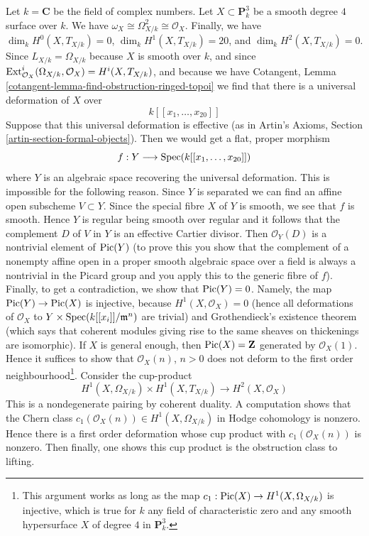 \medskip\noindent
Let $k = \mathbf{C}$ be the field of complex numbers.
Let $X \subset \mathbf{P}^3_k$ be a smooth degree
$4$ surface over $k$. We have
$\omega_X \cong \Omega^2_{X/k} \cong \mathcal{O}_X$.
Finally, we have
$\dim_k H^0(X, T_{X/k}) = 0$,
$\dim_k H^1(X, T_{X/k}) = 20$, and
$\dim_k H^2(X, T_{X/k}) = 0$.
Since $L_{X/k} = \Omega_{X/k}$ because $X$ is smooth over $k$,
and since $\mathop{\mathrm{Ext}}\nolimits^i_{\mathcal{O}_X}(\Omega_{X/k}, \mathcal{O}_X) =
H^i(X, T_{X/k})$, and because we have Cotangent, Lemma
\ref{cotangent-lemma-find-obstruction-ringed-topoi}
we find that there is a universal deformation of $X$
over
$$
k[[x_1, \ldots, x_{20}]]
$$
Suppose that this universal deformation is effective
(as in Artin's Axioms, Section \ref{artin-section-formal-objects}).
Then we would get a flat, proper morphism
$$
f : Y \longrightarrow \mathop{\mathrm{Spec}}(k[[x_1, \ldots, x_{20}]])
$$
where $Y$ is an algebraic space recovering the universal deformation.
This is impossible for the following reason. Since $Y$ is separated
we can find an affine open subscheme $V \subset Y$. Since the special
fibre $X$ of $Y$ is smooth, we see that $f$ is smooth. Hence $Y$
is regular being smooth over regular and it follows
that the complement $D$ of $V$ in $Y$ is an effective Cartier divisor.
Then $\mathcal{O}_Y(D)$ is a nontrivial element of $\mathop{\mathrm{Pic}}\nolimits(Y)$
(to prove this you show that the complement of a nonempty affine open in
a proper smooth algebraic space over a field is always a nontrivial
in the Picard group and you apply this to the generic fibre of $f$).
Finally, to get a contradiction, we show that $\mathop{\mathrm{Pic}}\nolimits(Y) = 0$.
Namely, the map $\mathop{\mathrm{Pic}}\nolimits(Y) \to \mathop{\mathrm{Pic}}\nolimits(X)$ is injective,
because $H^1(X, \mathcal{O}_X) = 0$ (hence all deformations of
$\mathcal{O}_X$ to $Y \times \mathop{\mathrm{Spec}}(k[[x_i]]/\mathfrak m^n)$
are trivial) and Grothendieck's existence theorem
(which says that coherent modules giving rise to the
same sheaves on thickenings are isomorphic).
If $X$ is general enough, then $\mathop{\mathrm{Pic}}\nolimits(X) = \mathbf{Z}$
generated by $\mathcal{O}_X(1)$. Hence it suffices to show that
$\mathcal{O}_X(n)$, $n > 0$ does not deform to the first
order neighbourhood\footnote{This argument works as long as
the map $c_1 : \mathop{\mathrm{Pic}}\nolimits(X) \to H^1(X, \Omega_{X/k})$
is injective, which is true for $k$ any field of characteristic zero
and any smooth hypersurface $X$ of degree $4$ in $\mathbf{P}^3_k$.}.
Consider the cup-product
$$
H^1(X, \Omega_{X/k}) \times H^1(X, T_{X/k})
\longrightarrow H^2(X, \mathcal{O}_X)
$$
This is a nondegenerate pairing by coherent duality.
A computation shows that the Chern class
$c_1(\mathcal{O}_X(n)) \in H^1(X, \Omega_{X/k})$
in Hodge cohomology is nonzero.
Hence there is a first order deformation
whose cup product with $c_1(\mathcal{O}_X(n))$ is nonzero.
Then finally, one shows this cup product is the obstruction
class to lifting.

